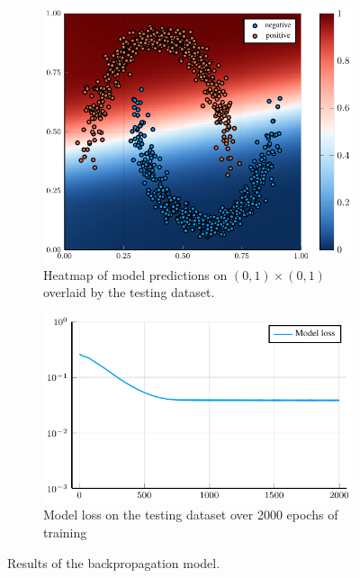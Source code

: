 \begin{figure}
	\centering
	\begin{subfigure}{0.49\textwidth}
		\centering
		\includegraphics[width=\textwidth]{images/backprop-heatmap/backprop.pdf}
		\caption{Heatmap of model predictions on \( \left( 0, 1 \right) \times \left( 0, 1 \right) \) overlaid by the testing dataset.}
	\end{subfigure}
	\begin{subfigure}{0.49\textwidth}
		\centering
		\includegraphics[width=\textwidth]{images/backprop-modelloss/backprop.pdf}
		\caption{Model loss on the testing dataset over 2000 epochs of training}
	\end{subfigure}
	\caption{Results of the backpropagation model.}\label{backprop_model}
\end{figure}

